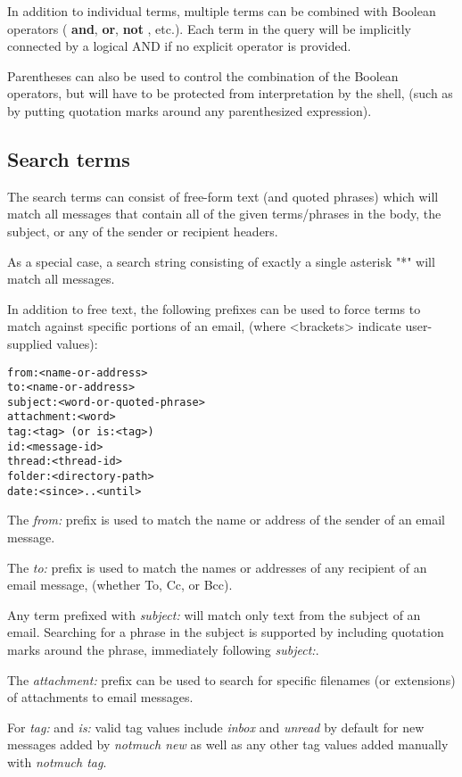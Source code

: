 \documentclass[a4,onecolumn,portrait]{article}
\begin{document}
In addition to individual terms, multiple terms can be combined with Boolean operators ( \textbf{and}, \textbf{or}, \textbf{not} , etc.). Each term in the query will be implicitly connected by a logical AND if no explicit operator is provided.

Parentheses can also be used to control the combination of the Boolean operators, but will have to be protected from interpretation by the shell, (such as by putting quotation marks around any parenthesized expression).
\subsection{Search terms}
\label{sec-7-2}

The search terms can consist of free-form text (and quoted phrases) which will match all messages that contain all of the given terms/phrases in the body, the subject, or any of the sender or recipient headers.

As a special case, a search string consisting of exactly a single asterisk "*" will match all messages.

In addition to free text, the following prefixes can be used to force terms to match against specific portions of an email, (where <brackets> indicate user-supplied values):

\begin{verbatim}
from:<name-or-address>
to:<name-or-address>
subject:<word-or-quoted-phrase>
attachment:<word>
tag:<tag> (or is:<tag>)
id:<message-id>
thread:<thread-id>
folder:<directory-path>
date:<since>..<until>
\end{verbatim}

The \emph{from:} prefix is used to match the name or address of the sender of an email message.

The \emph{to:} prefix is used to match the names or addresses of any recipient of an email message, (whether To, Cc, or Bcc).

Any term prefixed with \emph{subject:} will match only text from the subject of an email. Searching for a phrase in the subject is supported by including quotation marks around the phrase, immediately following \emph{subject:}.

The \emph{attachment:} prefix can be used to search for specific filenames (or extensions) of attachments to email messages.

For \emph{tag:} and \emph{is:} valid tag values include \emph{inbox} and \emph{unread} by default for new messages added by \emph{notmuch new} as well as any other tag values added manually with \emph{notmuch tag}.
\end{document}
